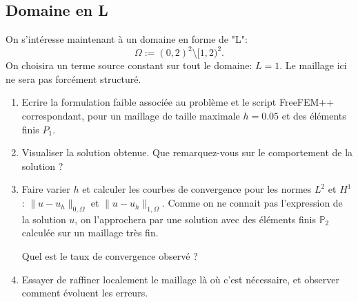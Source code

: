 \medskip

%
%
%
%
%
%

\subsection{Domaine en L}

On s'intéresse maintenant à un domaine en forme de "L":
\[
\Omega := (0,2)^2 \setminus [1,2)^2.
\]
On choisira un terme source constant sur tout le domaine: $L=1$.
Le maillage ici ne sera pas forcément structuré.

\begin{enumerate}

\item Ecrire la formulation faible associée au problème et le script FreeFEM++ correspondant, pour un maillage de taille maximale $h=0.05$ et des éléments finis $P_1$.

\item Visualiser la solution obtenue. Que remarquez-vous sur le comportement de la solution ?

\item Faire varier $h$ et calculer les courbes de convergence pour les normes $L^2$ et $H^1$:
$\| u - u_h \|_{0,\Omega}$
et
$\| u - u_h \|_{1,\Omega}$.
Comme on ne connait pas l'expression de la solution $u$, on l'approchera par une solution avec des éléments finis $\mathbb{P}_2$ calculée sur un maillage très fin.

Quel est le taux de convergence observé ?




\item Essayer de raffiner localement le maillage là où c'est nécessaire, et observer comment évoluent les erreurs.

\end{enumerate}


